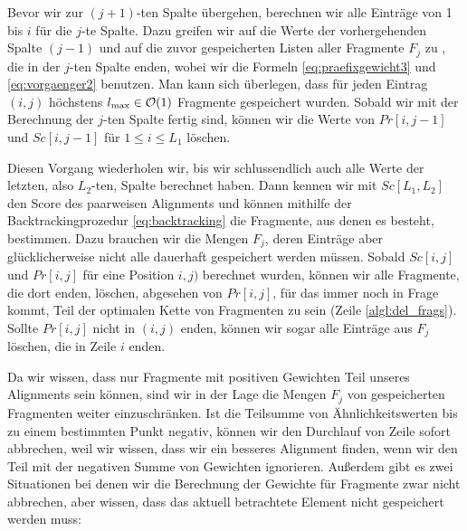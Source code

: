 Bevor wir zur $(j+1)$-ten Spalte übergehen, berechnen wir alle Einträge von 1 bis $i$ für die $j$-te Spalte. Dazu greifen wir auf die Werte der vorhergehenden Spalte $(j-1)$ und auf die zuvor gespeicherten Listen aller Fragmente $F_j$ zu , die in der $j$-ten Spalte enden, wobei wir die Formeln \eqref{eq:praefixgewicht3} und \eqref{eq:vorgaenger2} benutzen. Man kann sich überlegen, dass für jeden Eintrag $(i,j)$ höchstens $l_{\max} \in \mathcal{O}(1)$ Fragmente gespeichert wurden. Sobald wir mit der Berechnung der $j$-ten Spalte fertig sind, können wir die Werte von $Pr[i,j-1]$ und $Sc[i,j-1]$ für $1 \leq i \leq L_1$ löschen.

Diesen Vorgang wiederholen wir, bis wir schlussendlich auch alle Werte der letzten, also $L_2$-ten, Spalte berechnet haben. Dann kennen wir mit $Sc[L_1,L_2]$ den Score des paarweisen Alignments und können mithilfe der Backtrackingprozedur \eqref{eq:backtracking} die Fragmente, aus denen es besteht, bestimmen. Dazu brauchen wir die Mengen $F_j$, deren Einträge aber glücklicherweise nicht alle dauerhaft gespeichert werden müssen. Sobald $Sc[i,j]$ und $Pr[i,j]$ für eine Position $i,j)$ berechnet wurden, können wir alle Fragmente, die dort enden, löschen, abgesehen von $Pr[i,j]$, für das immer noch in Frage kommt, Teil der optimalen Kette von Fragmenten zu sein (Zeile \ref{algl:del_frags}). Sollte $Pr[i,j]$ nicht in $(i,j)$ enden, können wir sogar alle Einträge aus $F_j$ löschen, die in Zeile $i$ enden.

Da wir wissen, dass nur Fragmente mit positiven Gewichten Teil unseres Alignments sein können, sind wir in der Lage die Mengen $F_j$ von gespeicherten Fragmenten weiter einzuschränken. Ist die Teilsumme von Ähnlichkeitswerten bis zu einem bestimmten Punkt negativ, können wir den Durchlauf von Zeile  sofort abbrechen, weil wir wissen, dass wir ein besseres Alignment finden, wenn wir den Teil mit der negativen Summe von Gewichten ignorieren. Außerdem gibt es zwei Situationen bei denen wir die Berechnung der Gewichte für Fragmente zwar nicht abbrechen, aber wissen, dass das aktuell betrachtete Element nicht gespeichert werden muss:

